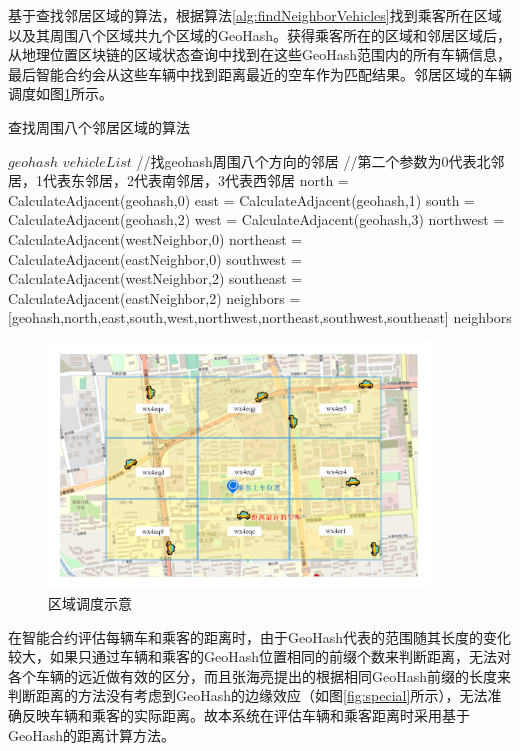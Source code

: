 基于查找邻居区域的算法，根据算法\ref{alg:findNeighborVehicles}找到乘客所在区域以及其周围八个区域共九个区域的GeoHash。获得乘客所在的区域和邻居区域后，从地理位置区块链的区域状态查询中找到在这些GeoHash范围内的所有车辆信息，最后智能合约会从这些车辆中找到距离最近的空车作为匹配结果。邻居区域的车辆调度如图\ref{fig:regionManage}所示。

\begin{algorithm}[h]
  \caption{查找周围八个邻居区域的算法}
  \label{alg:findNeighborVehicles}
  \begin{algorithmic}[1]
  \REQUIRE $geohash$
  \ENSURE $vehicleList$
  \STATE //找geohash周围八个方向的邻居
  \STATE //第二个参数为0代表北邻居，1代表东邻居，2代表南邻居，3代表西邻居
  \STATE north = CalculateAdjacent(geohash,0)
  \STATE east = CalculateAdjacent(geohash,1)
  \STATE south = CalculateAdjacent(geohash,2)
  \STATE west = CalculateAdjacent(geohash,3)
  \STATE northwest = CalculateAdjacent(westNeighbor,0)
  \STATE northeast = CalculateAdjacent(eastNeighbor,0)
  \STATE southwest = CalculateAdjacent(westNeighbor,2)
  \STATE southeast = CalculateAdjacent(eastNeighbor,2)
  \STATE neighbors = [geohash,north,east,south,west,northwest,northeast,southwest,southeast]
  \RETURN neighbors
  \end{algorithmic}
\end{algorithm}

\begin{figure}[h]
  \centering
  \includegraphics[width=0.9\textwidth]{figures/区域调度}
  \caption{区域调度示意}\label{fig:regionManage}
\end{figure}

在智能合约评估每辆车和乘客的距离时，由于GeoHash代表的范围随其长度的变化较大，如果只通过车辆和乘客的GeoHash位置相同的前缀个数来判断距离，无法对各个车辆的远近做有效的区分，而且张海亮提出的根据相同GeoHash前缀的长度来判断距离的方法没有考虑到GeoHash的边缘效应（如图\ref{fig:special}所示），无法准确反映车辆和乘客的实际距离。故本系统在评估车辆和乘客距离时采用基于GeoHash的距离计算方法。

